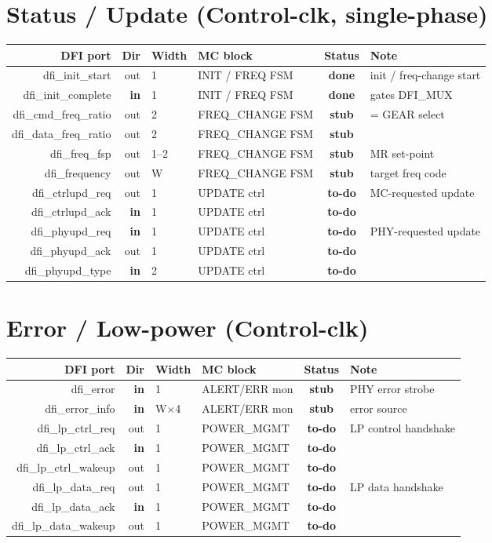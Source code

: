 \documentclass[9pt]{extarticle}
\newcommand{\done}{\textbf{\textcolor{gdone}{done}}}
\newcommand{\stub}{\textbf{\textcolor{gstub}{stub}}}
\newcommand{\todo}{\textbf{\textcolor{gtodo}{to-do}}}
\newenvironment{portmap}{%
  \footnotesize\begin{longtable}{N D W B S X}\toprule
  \textbf{DFI port} & \textbf{Dir} & \textbf{Width} & \textbf{MC block} & \textbf{Status} & \textbf{Note}\\ \midrule\endhead}
  {\bottomrule\end{longtable}}
\begin{document}
\section{Status / Update (Control-clk, single-phase)}
\begin{portmap}
dfi\_init\_start & out & 1 & INIT / FREQ FSM & \done & init / freq-change start\\
dfi\_init\_complete & \textbf{in} & 1 & INIT / FREQ FSM & \done & gates DFI\_MUX\\
dfi\_cmd\_freq\_ratio & out & 2 & FREQ\_CHANGE FSM & \stub & = GEAR select\\
dfi\_data\_freq\_ratio & out & 2 & FREQ\_CHANGE FSM & \stub & \\
dfi\_freq\_fsp & out & 1--2 & FREQ\_CHANGE FSM & \stub & MR set-point\\
dfi\_frequency & out & W & FREQ\_CHANGE FSM & \stub & target freq code\\
dfi\_ctrlupd\_req & out & 1 & UPDATE ctrl & \todo & MC-requested update\\
dfi\_ctrlupd\_ack & \textbf{in} & 1 & UPDATE ctrl & \todo & \\
dfi\_phyupd\_req & \textbf{in} & 1 & UPDATE ctrl & \todo & PHY-requested update\\
dfi\_phyupd\_ack & out & 1 & UPDATE ctrl & \todo & \\
dfi\_phyupd\_type & \textbf{in} & 2 & UPDATE ctrl & \todo & \\
\end{portmap}

\section{Error / Low-power (Control-clk)}
\begin{portmap}
dfi\_error & \textbf{in} & 1 & ALERT/ERR mon & \stub & PHY error strobe\\
dfi\_error\_info & \textbf{in} & W$\times$4 & ALERT/ERR mon & \stub & error source\\
dfi\_lp\_ctrl\_req & out & 1 & POWER\_MGMT & \todo & LP control handshake\\
dfi\_lp\_ctrl\_ack & \textbf{in} & 1 & POWER\_MGMT & \todo & \\
dfi\_lp\_ctrl\_wakeup & out & 1 & POWER\_MGMT & \todo & \\
dfi\_lp\_data\_req & out & 1 & POWER\_MGMT & \todo & LP data handshake\\
dfi\_lp\_data\_ack & \textbf{in} & 1 & POWER\_MGMT & \todo & \\
dfi\_lp\_data\_wakeup & out & 1 & POWER\_MGMT & \todo & \\
\end{portmap}
\end{document}
